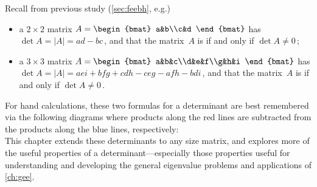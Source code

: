 Recall from previous study (\cref{sec:feebh}, e.g.)
\begin{itemize}
\item a \(2\times 2\) matrix \(A=\begin{bmat} a&b\\c&d \end{bmat}\) has  \(\det A=|A|=ad-bc\)\,, and that the matrix~\(A\) is   if and only if \(\det A\neq0\)\,;
\item a \(3\times 3\) matrix \(A=\begin{bmat} a&b&c\\d&e&f\\g&h&i \end{bmat}\) has  \(\det A=|A|=aei+bfg+cdh-ceg-afh-bdi\)\,, and that the matrix~\(A\) is  if and only if \(\det A\neq0\)\,.
\end{itemize}
For hand calculations, these two formulas for a determinant are best remembered via the following diagrams where products along the red lines are subtracted from the products along the blue lines, respectively:
\begin{equation}

\label{eq:dets23b}
\end{equation}
This chapter extends these determinants to any size matrix, and explores more of the useful properties of a determinant---especially those properties useful for understanding and developing the general eigenvalue problems and applications of \cref{ch:gee}.





\endinput

